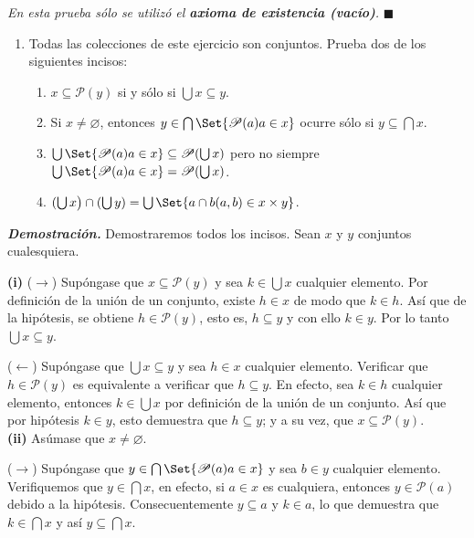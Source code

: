 \documentclass[12pt]{article}
\providecommand\given{}
\renewcommand{\emptyset}{\varnothing}
\newcounter{A}
\newenvironment{ejercicio}{\begin{enumerate}[\bfseries \text{EJ \theA}.]\item}{\end{enumerate}\stepcounter{A}}
\begin{document}
    \hfill \textit{En esta prueba sólo se utilizó el \textbf{axioma de existencia (vacío)}.} \quad \ensuremath{\blacksquare} \\

    \begin{ejercicio}
        Todas las colecciones de este ejercicio son conjuntos. Prueba dos de los siguientes incisos:
        \begin{enumerate}
            \item \(x \subseteq \mathscr{P}(y)\) si y sólo si \(\bigcup x \subseteq y\).
            \item Si \(x \neq \emptyset\), entonces \(y \in \bigcap\Set{\mathscr{P}(a) \given a \in x}\) ocurre sólo si \(y \subseteq \bigcap x\).
            \item \( \bigcup \Set{ \mathscr{P}(a) \given a \in x } \subseteq \mathscr{P}(\bigcup x) \) pero no siempre \( \bigcup \Set{ \mathscr{P}(a) \given a \in x } = \mathscr{P}(\bigcup x) \).
            \item \( ( \bigcup x \big) \cap ( \bigcup y ) = \bigcup \Set{ a \cap b \given (a,b) \in x \times y } \).
        \end{enumerate}
    \end{ejercicio}

    \textbf{\textit{Demostración.}} Demostraremos todos los incisos. Sean \(x\) y \(y\) conjuntos cualesquiera.

    \textbf{(i)} (\(\rightarrow\)) Supóngase que \(x \subseteq \mathscr{P}(y)\) y sea \(k \in \bigcup x\) cualquier elemento. Por definición de la unión de un conjunto, existe \(h \in x\) de modo que \(k \in h\). Así que de la hipótesis, se obtiene \(h \in \mathscr{P}(y)\), esto es, \(h \subseteq y\) y con ello \(k \in y\). Por lo tanto \(\bigcup x \subseteq y\).

    (\(\leftarrow\)) Supóngase que \(\bigcup x \subseteq y\) y sea \(h \in x\) cualquier elemento. Verificar que \(h \in \mathscr{P}(y)\) es equivalente a verificar que \(h \subseteq y\). En efecto, sea \(k \in h\) cualquier elemento, entonces \(k \in \bigcup x\) por definición de la unión de un conjunto. Así que por hipótesis \(k \in y\), esto demuestra que \(h \subseteq y\); y a su vez, que \(x \subseteq \mathscr{P}(y)\).\\

    \textbf{(ii)} Asúmase que \(x \neq \emptyset\).
    
    (\(\rightarrow\)) Supóngase que \(y \in \bigcap\Set{\mathscr{P}(a) \given a \in x}\) y sea \(b \in y\) cualquier elemento. Verifiquemos que \(y \in \bigcap x\), en efecto, si \(a \in x\) es cualquiera, entonces \(y \in \mathscr{P}(a)\) debido a la hipótesis. Consecuentemente \(y \subseteq a\) y \(k \in a\), lo que demuestra que \(k \in \bigcap x\) y así \(y \subseteq \bigcap x\).
\end{document}
